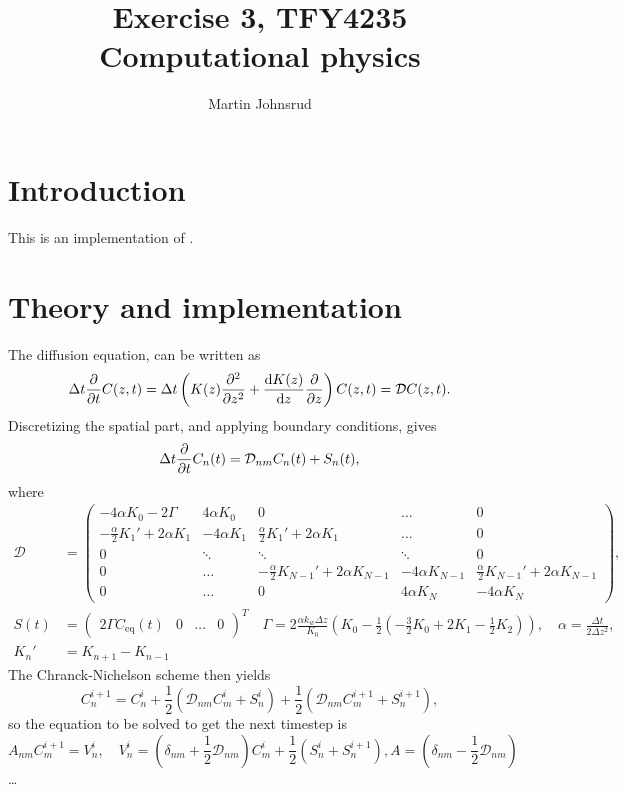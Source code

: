 \documentclass{article}
\title{Exercise 3, TFY4235 Computational physics}
\author{Martin Johnsrud}
\date{}
\begin{document}
    \maketitle
    \section*{Introduction}
        This is an implementation of \cite{exercise}.
    \section*{Theory and implementation}
    The diffusion equation, can be written as
    \begin{equation*}
        \Delta t \pdv{t} C(z, t) = \Delta t \left(K(z) \pdv[2]{z} + \dv{K(z)}{z}\pdv{z}\right) C(z, t) = \mathcal{D} C(z, t).
    \end{equation*}
    Discretizing the spatial part, and applying boundary conditions, gives
    \begin{equation*}
        \Delta t \pdv{t} C_n(t) = \mathcal{D}_{nm} C_n(t) + S_n(t),
    \end{equation*}
    where 
    \begin{align*}
        \mathcal{D} &=
        \begin{pmatrix}
            -4\alpha K_0 - 2\Gamma & 4\alpha K_0 & 0 & \dots&0 \\
            -\frac{\alpha}{2} K_1' + 2\alpha K_1 & -4 \alpha K_1 & \frac{\alpha}{2}K_1' + 2\alpha K_1 &  \dots & 0 \\
            0 & \ddots & \ddots & \ddots & 0\\
            0 & \dots &-\frac{\alpha}{2} K_{N-1}' + 2\alpha K_{N-1} & -4 \alpha K_{N-1} & \frac{\alpha}{2}K_{N-1}' + 2\alpha K_{N-1} \\
             0 & \dots & 0 & 4\alpha K_N & -4\alpha K_N
        \end{pmatrix},\\
        S(t) & =  
        \begin{pmatrix}
            2\Gamma C_\mathrm{eq}(t) &0&\dots&0
        \end{pmatrix}^T \quad 
    \Gamma = 2 \frac{\alpha k_w \Delta z}{K_0} \left(K_0 - \frac{1}{2}(-\frac{3}{2} K_0 + 2K_1 - \frac{1}{2}K_2)\right), \quad
     \alpha = \frac{\Delta t}{2 \Delta z^2 },\\
      K_n' & = K_{n+1} - K_{n-1}
    \end{align*}
    The Chranck-Nichelson scheme then yields
    \begin{equation*}
        C_n^{i+1}  = C_n^i + \frac{1}{2} (\mathcal{D}_{nm} C_m^i + S_n^i) + \frac{1}{2} (\mathcal{D}_{nm} C_m^{i+1} + S_n^{i+1}),
    \end{equation*}
    so the equation to be solved to get the next timestep is
    \begin{equation*}
        A_{nm} C_{m}^{i+1} = V_n^i, \quad V_n^i = \left(\delta_{nm} + \frac{1}{2} \mathcal{D}_{nm}\right) C_m^i + \frac{1}{2}(S_n^i + S_n^{i+1}), A = \left(\delta_{nm} - \frac{1}{2} \mathcal{D}_{nm}\right)
    \end{equation*}
    \dots
\end{document}
